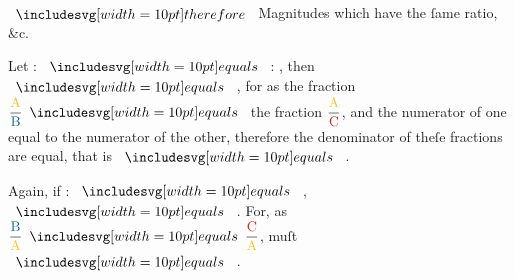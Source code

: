 \documentclass[11pt,preview]{standalone}
\begin{document}
$\btherefore$ Magnitudes which have the ſame ratio, \&c.

Let {\color{cyellow}{A}} : {\color{cblue}{B}} $\bequals$ {\color{cyellow}{A}} : {\color{cred}{C}}, then {\color{cblue}{B}} $\bequals$ {\color{cred}{C}}, for as the fraction $\dfrac{\text{{\color{cyellow}{A}}}}{\text{{\color{cblue}{B}}}} \bequals$ the fraction $\dfrac{\text{{\color{cyellow}{A}}}}{\text{{\color{cred}{C}}}}$, and the numerator of one equal to the numerator of the other, therefore the denominator of theſe fractions are equal, that is {\color{cblue}{B}} $\bequals$ {\color{cred}{C}}.

Again, if {\color{cblue}{B}} : {\color{cyellow}{A}} $\bequals$ {\color{cred}{C}}, {\color{cblue}{B}} $\bequals$ {\color{cred}{C}}. For, as $\dfrac{\text{{\color{cblue}{B}}}}{\text{{\color{cyellow}{A}}}} \bequals \dfrac{\text{{\color{cred}{C}}}}{\text{{\color{cyellow}{A}}}}$, {\color{cblue}{B}} muſt $\bequals$ {\color{cred}{C}}.
\end{document}
